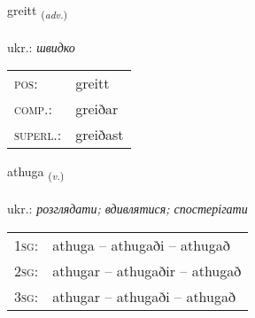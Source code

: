 \documentclass[frontgrid, backgrid]{flacards}\usepackage[]{graphicx}\usepackage[]{xcolor}
\begin{document}
\renewcommand{\flhead}{\vskip5pt \fboxsep=0pt {\small\bfseries\footnotesize Atviksorð | прислівник}}
\renewcommand{\fcfoot}{\vskip5pt \fboxsep=0pt \hspace{2pt}{\small\bfseries\footnotesize 2K}}

\renewcommand{\blhead}{\vskip5pt {\small\bfseries\footnotesize Atviksorð | прислівник }}
\renewcommand{\bcfoot}{\vskip5pt \hspace{2pt}{\small\bfseries\footnotesize 2K}}


{greitt \small{\textsubscript{(\textit{adv.})}} \\[1ex] %
\textphonetic{[kreiht]} \\
ukr.: \emph{швидко} \\  [2ex]
\renewcommand*{\arraystretch}{0.8}
\begin{tabular}{ll}
\textsc{pos}: & greitt \\ 
\textsc{comp.}: & greiðar \\ 
\textsc{superl.}: & greiðast \\
\end{tabular}
}

\renewcommand{\flhead}{\vskip5pt \fboxsep=0pt {\small\bfseries\footnotesize Sagnorð | дієслово}}
\renewcommand{\fcfoot}{\vskip5pt \fboxsep=0pt \hspace{2pt}{\small\bfseries\footnotesize 2K}}

\renewcommand{\blhead}{\vskip5pt {\small\bfseries\footnotesize Sagnorð | дієслово }}
\renewcommand{\bcfoot}{\vskip5pt \hspace{2pt}{\small\bfseries\footnotesize 2K}}


{athuga \small{\textsubscript{(\textit{v.})}} \\[1ex] %
\textphonetic{[aːthʏɣa]} \\
ukr.: \emph{розглядати; вдивлятися; спостерігати} \\  [2ex]
\renewcommand*{\arraystretch}{0.8}
\begin{tabular}{p{1cm}l}
\textsc{1sg}: & athuga -- athugaði -- athugað \\ 
\textsc{2sg}: & athugar -- athugaðir -- athugað \\ 
\textsc{3sg}: & athugar -- athugaði -- athugað \\ 
\end{tabular}
}
\end{document}
